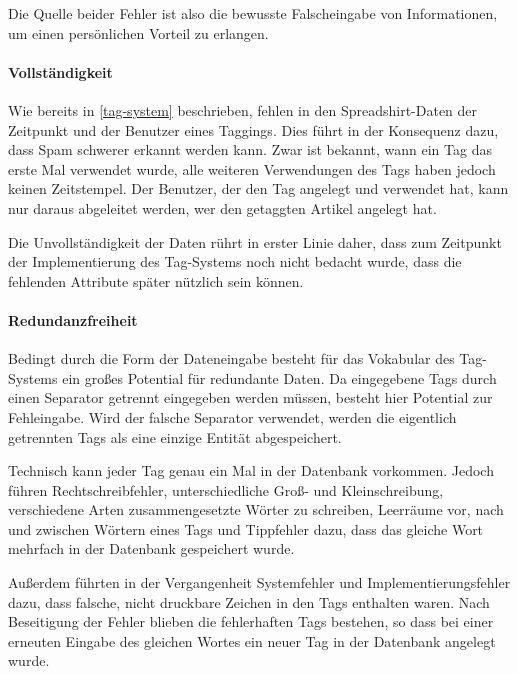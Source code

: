 Die Quelle beider Fehler ist also die bewusste Falscheingabe von Informationen, um einen persönlichen Vorteil zu erlangen.
                                                                                                                                                                                                                                                                                                                                                                                                              
\paragraph{Vollständigkeit}

Wie bereits in \ref{tag-system} beschrieben, fehlen in den Spreadshirt-Daten der Zeitpunkt und der Benutzer eines Taggings. Dies führt in der Konsequenz dazu, dass Spam schwerer erkannt werden kann. Zwar ist bekannt, wann ein Tag das erste Mal verwendet wurde, alle weiteren Verwendungen des Tags haben jedoch keinen Zeitstempel. Der Benutzer, der den Tag angelegt und verwendet hat, kann nur daraus abgeleitet werden, wer den getaggten Artikel angelegt hat.

Die Unvollständigkeit der Daten rührt in erster Linie daher, dass zum Zeitpunkt der Implementierung des Tag-Systems noch nicht bedacht wurde, dass die fehlenden Attribute später nützlich sein können.

\paragraph{Redundanzfreiheit}

Bedingt durch die Form der Dateneingabe besteht für das Vokabular des Tag-Systems ein großes Potential für redundante Daten. Da eingegebene Tags durch einen Separator getrennt eingegeben werden müssen, besteht hier Potential zur Fehleingabe. Wird der falsche Separator verwendet, werden die eigentlich getrennten Tags als eine einzige Entität abgespeichert.

Technisch kann jeder Tag genau ein Mal in der Datenbank vorkommen. Jedoch führen Rechtschreibfehler, unterschiedliche Groß- und Kleinschreibung, verschiedene Arten zusammengesetzte Wörter zu schreiben, Leerräume vor, nach und zwischen Wörtern eines Tags und Tippfehler dazu, dass das gleiche Wort mehrfach in der Datenbank gespeichert wurde.

Außerdem führten in der Vergangenheit Systemfehler und Implementierungsfehler dazu, dass falsche, nicht druckbare Zeichen in den Tags enthalten waren. Nach Beseitigung der Fehler blieben die fehlerhaften Tags bestehen, so dass bei einer erneuten Eingabe des gleichen Wortes ein neuer Tag in der Datenbank angelegt wurde.

